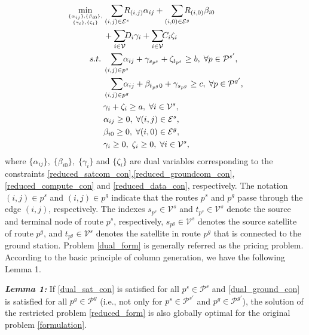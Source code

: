 \documentclass[journal,10pt]{IEEEtran}
\begin{document}
\begin{subequations}
\label{dual_form}
\begin{align}
\min_{\{\alpha_{ij}\},\{\beta_{i0}\}, \atop \{\gamma_i\},\{\zeta_i\}}  & \sum_{(i,j) \in \mathcal{E}^{s}} \!\!\!\!\! R_{(i,j)} \alpha_{ij} + \sum_{(i,0) \in \mathcal{E}^{g}} \!\!\!\!\! R_{(i,0)} \beta_{i0} \notag \\ & + \sum_{i \in \mathcal{V}} \!\! D_i \gamma_i + \sum_{i \in \mathcal{V}} \!\! C_i \zeta_i \label{dual_Obj} \\
s.t. \;
& \sum_{(i,j) \in p^s} \!\!\!\!\! \alpha_{ij} + \gamma_{s_{p^s}} + \zeta_{t_{p^s}} \geq b, \; \forall p \in \mathcal{P}^{s'}, \label{dual_sat_con} \\
& \sum_{(i,j) \in p^g} \!\!\!\!\! \alpha_{ij} + \beta_{t_{p^g}0} + \gamma_{s_{p^g}} \geq c, \; \forall p \in \mathcal{P}^{g'}, \label{dual_ground_con} \\
& \gamma_i + \zeta_i \geq a, \; \forall i \in \mathcal{V}^s, \label{dual_local_con} \\
&  \alpha_{ij} \geq 0, \; \forall (i,j) \in \mathcal{E}^s, \label{dual_alpha_nonneg} \\
&  \beta_{i0} \geq 0, \; \forall (i,0) \in \mathcal{E}^g, \\
&  \gamma_i \geq 0, \; \zeta_i \geq 0, \; \forall i \in \mathcal{V}^s,
\end{align}
\end{subequations}where $\{\alpha_{ij}\}, \; \{\beta_{i0}\}, \; \{\gamma_i\}$ and $ \{\zeta_i\}$ are dual variables corresponding to the constraints \eqref{reduced_satcom_con},\eqref{reduced_groundcom_con},\eqref{reduced_compute_con} and \eqref{reduced_data_con}, respectively. The notation $(i,j) \in p^s$ and $(i,j) \in p^g$ indicate that the routes $p^s$ and $p^g$ passe through the edge $(i,j)$, respectively. The indexes $s_{p^s} \in \mathcal{V}^s$ and $t_{p^s} \in \mathcal{V}^s$ denote the source and terminal node of route $p^s$, respectively, $s_{p^g} \in \mathcal{V}^s$ denotes the source satellite of route $p^g$, and $t_{p^g} \in \mathcal{V}^s$ denotes the satellite in route $p^g$ that is connected to the ground station. Problem \eqref{dual_form} is generally referred as the pricing problem. According to the basic principle of column generation, we have the following Lemma 1.

\textit{\textbf{Lemma 1:}} If \eqref{dual_sat_con} is satisfied for all $p^s \!\in \! \mathcal{P}^s$ and \eqref{dual_ground_con} is satisfied for all $p^g \!\in \! \mathcal{P}^g$ (i.e., not only for $p^s \! \in \! \mathcal{P}^{s'}$ and $p^g \! \in \! \mathcal{P}^{g'}$), the solution of the restricted problem \eqref{reduced_form} is also globally optimal for the original problem \eqref{formulation}.
\end{document}

